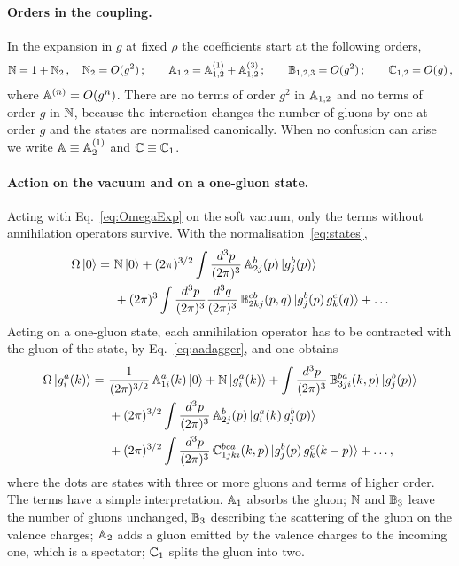 \paragraph{Orders in the coupling.} In the expansion in $g$ at fixed $\rho$ the coefficients start at the following orders,
\begin{align}\label{eq:orders}
\mathbb{N}=1+\mathbb{N}_2\,,\quad \mathbb{N}_2=O(g^2)\,;\qquad
\mathbb{A}_{1,2}=\mathbb{A}^{(1)}_{1,2}+\mathbb{A}^{(3)}_{1,2}\,;\qquad
\mathbb{B}_{1,2,3}=O(g^2)\,;\qquad \mathbb{C}_{1,2}=O(g)\,,
\end{align}
where $\mathbb{A}^{(n)}=O(g^n)$. There are no terms of order $g^2$ in $\mathbb{A}_{1,2}$ and no terms of order $g$ in $\mathbb{N}$, because the interaction changes the number of gluons by one at order $g$ and the states are normalised canonically. When no confusion can arise we write $\mathbb{A}\equiv\mathbb{A}^{(1)}_2$ and $\mathbb{C}\equiv\mathbb{C}_1$.

\paragraph{Action on the vacuum and on a one-gluon state.} Acting with Eq.~\eqref{eq:OmegaExp} on the soft vacuum, only the terms without annihilation operators survive. With the normalisation~\eqref{eq:states},
\begin{align}\label{eq:Omegavac}
\Omega\ket0=\ &\mathbb{N}\ket0+(2\pi)^{3/2}\int\frac{d^3p}{(2\pi)^3}\,\mathbb{A}^b_{2j}(p)\ket{g^b_j(p)}\notag\\&+(2\pi)^3\int\frac{d^3p}{(2\pi)^3}\frac{d^3q}{(2\pi)^3}\,\mathbb{B}^{cb}_{2kj}(p,q)\ket{g^b_j(p)\,g^c_k(q)}+\dots
\end{align}
Acting on a one-gluon state, each annihilation operator has to be contracted with the gluon of the state, by Eq.~\eqref{eq:aadagger}, and one obtains
\begin{align}\label{eq:Omegag}
\Omega\ket{g^a_i(k)}=\ &\frac{1}{(2\pi)^{3/2}}\,\mathbb{A}^a_{1i}(k)\ket0+\mathbb{N}\ket{g^a_i(k)}+\int\frac{d^3p}{(2\pi)^3}\,\mathbb{B}^{ba}_{3ji}(k,p)\ket{g^b_j(p)}
\notag\\&
+(2\pi)^{3/2}\int\frac{d^3p}{(2\pi)^3}\,\mathbb{A}^b_{2j}(p)\ket{g^a_i(k)\,g^b_j(p)}
\notag\\&+(2\pi)^{3/2}\int\frac{d^3p}{(2\pi)^3}\,\mathbb{C}^{bca}_{1jki}(k,p)\ket{g^b_j(p)\,g^c_k(k-p)}+\dots,
\end{align}
where the dots are states with three or more gluons and terms of higher order. The terms have a simple interpretation. $\mathbb{A}_1$ absorbs the gluon; $\mathbb{N}$ and $\mathbb{B}_3$ leave the number of gluons unchanged, $\mathbb{B}_3$ describing the scattering of the gluon on the valence charges; $\mathbb{A}_2$ adds a gluon emitted by the valence charges to the incoming one, which is a spectator; $\mathbb{C}_1$ splits the gluon into two.

